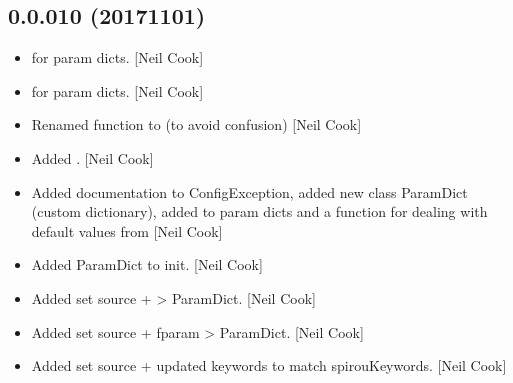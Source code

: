 \documentclass[a4paper,10pt,english]{report}
\begin{document}
\subsection{0.0.010 (2017\sphinxhyphen{}11\sphinxhyphen{}01)}
\label{\detokenize{misc/changelog:id559}}\begin{itemize}
\item {} 
 for param dicts. {[}Neil Cook{]}

\item {} 
 for param dicts. {[}Neil Cook{]}

\item {} 
Renamed  function to 
(to avoid confusion) {[}Neil Cook{]}

\item {} 
Added . {[}Neil Cook{]}

\item {} 
Added documentation to ConfigException, added new class ParamDict
(custom dictionary), added  to param dicts and a 
function for dealing with default values from  {[}Neil
Cook{]}

\item {} 
Added ParamDict to init. {[}Neil Cook{]}

\item {} 
Added set source +  \textendash{}\textgreater{} ParamDict. {[}Neil Cook{]}

\item {} 
Added set source + fparam \textendash{}\textgreater{} ParamDict. {[}Neil Cook{]}

\item {} 
Added set source + updated keywords to match spirouKeywords. {[}Neil
Cook{]}

\end{itemize}
\end{document}
